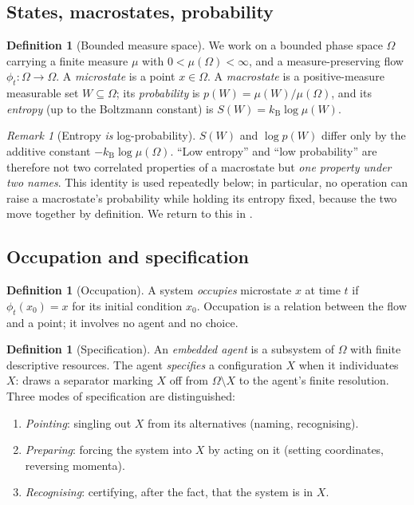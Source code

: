 \documentclass[11pt,a4paper]{article}
\theoremstyle{thmstyle}
\theoremstyle{definition}
\newtheorem{definition}[theorem]{Definition}
\theoremstyle{remark}
\newtheorem{remark}[theorem]{Remark}
\newcommand{\Space}{\Omega}
\newcommand{\kB}{k_{\mathrm{B}}}
\newcommand{\Wmac}{W}
\begin{document}
\subsection{States, macrostates, probability}

\begin{definition}[Bounded measure space]
\label{def:space}
We work on a bounded phase space $\Space$ carrying a finite measure $\mu$ with
$0<\mu(\Space)<\infty$, and a measure-preserving flow $\phi_t:\Space\to\Space$.
A \emph{microstate} is a point $x\in\Space$. A \emph{macrostate} is a
positive-measure measurable set $\Wmac\subseteq\Space$; its \emph{probability}
is $p(\Wmac)=\mu(\Wmac)/\mu(\Space)$, and its \emph{entropy} (up to the
Boltzmann constant) is $S(\Wmac)=\kB\log\mu(\Wmac)$.
\end{definition}

\begin{remark}[Entropy \emph{is} log-probability]
\label{rem:entropy-is-prob}
$S(\Wmac)$ and $\log p(\Wmac)$ differ only by the additive constant
$-\kB\log\mu(\Space)$. ``Low entropy'' and ``low probability'' are therefore not
two correlated properties of a macrostate but \emph{one property under two
names}. This identity is used repeatedly below; in particular, no operation can
raise a macrostate's probability while holding its entropy fixed, because the
two move together by definition. We return to this in .
\end{remark}

\subsection{Occupation and specification}

\begin{definition}[Occupation]
\label{def:occ}
A system \emph{occupies} microstate $x$ at time $t$ if $\phi_t(x_0)=x$ for its
initial condition $x_0$. Occupation is a relation between the flow and a point;
it involves no agent and no choice.
\end{definition}

\begin{definition}[Specification]
\label{def:spec}
An \emph{embedded agent} is a subsystem of $\Space$ with finite descriptive
resources. The agent \emph{specifies} a configuration $X$ when it individuates
$X$: draws a separator marking $X$ off from $\Space\setminus X$ to the agent's
finite resolution. Three modes of specification are distinguished:
\begin{enumerate}[label=\textup{(S\arabic*)},leftmargin=3em,nosep]
\item\label{s:point} \emph{Pointing}: singling out $X$ from its alternatives
(naming, recognising).
\item\label{s:prepare} \emph{Preparing}: forcing the system into $X$ by acting
on it (setting coordinates, reversing momenta).
\item\label{s:recognise} \emph{Recognising}: certifying, after the fact, that
the system is in $X$.
\end{enumerate}
\end{definition}
\end{document}
